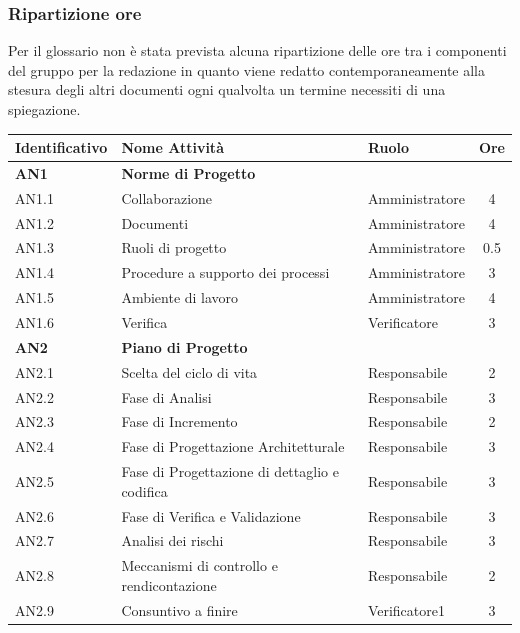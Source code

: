\subsubsection{Ripartizione ore}
Per il glossario non è stata prevista alcuna ripartizione delle ore tra i componenti del gruppo per la redazione in quanto viene redatto contemporaneamente alla stesura degli altri documenti ogni qualvolta un termine necessiti di una spiegazione.
\bgroup
\begin{longtable}{|l|l|l|c|}
  \endfirsthead
  \hline
  \textbf{Identificativo} &
  \textbf{Nome Attività} &
  \textbf{Ruolo} &
  \textbf{Ore}\\
  \endhead
  \hline
  \textbf{AN1} & \textbf{Norme di Progetto} &  &  \\
  \hline
  	{AN1.1} & Collaborazione & Amministratore  & 4\\
  	\hline
  	{AN1.2} & Documenti & Amministratore & 4\\
  	\hline
  	{AN1.3} & {Ruoli di progetto} & Amministratore &  0.5\\
  	\hline
  	{AN1.4} & {Procedure a supporto dei processi} & Amministratore  &  3\\
  	\hline
  	{AN1.5} & {Ambiente di lavoro} & Amministratore &  4\\
  	\hline
  	{AN1.6} & {Verifica} & Verificatore & 3 \\
  \hline
  \textbf{AN2} & \textbf{Piano di Progetto}  & & \\
    \hline
    	{AN2.1} & {Scelta del ciclo di vita} & Responsabile &  2\\
    	\hline
    	{AN2.2} & {Fase di Analisi} & Responsabile& 3 \\
    	\hline
    	{AN2.3} & {Fase di Incremento} & Responsabile& 2 \\
    	\hline
    	{AN2.4} & {Fase di Progettazione Architetturale} & Responsabile &   3\\
    	\hline
    	{AN2.5} & {Fase di Progettazione di dettaglio e codifica} & Responsabile  &  3\\
    	\hline
    	{AN2.6} & {Fase di Verifica e Validazione} & Responsabile  &  3\\
    	\hline
    	{AN2.7} & {Analisi dei rischi} & Responsabile  &  3\\
    	\hline
    	{AN2.8} & {Meccanismi di controllo e rendicontazione} & Responsabile & 2\\
    	\hline
    	{AN2.9} & {Consuntivo a finire} & Verificatore1  & 3\\
    	\hline

\end{longtable}
